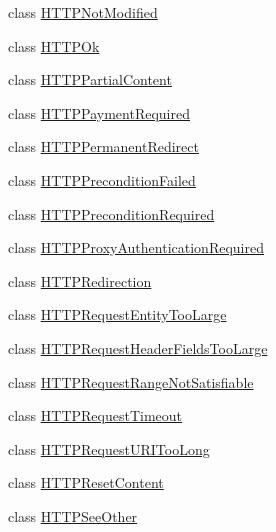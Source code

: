 \begin{DoxyCompactItemize}
\item 
class \hyperlink{classaiohttp_1_1web__exceptions_1_1_h_t_t_p_not_modified}{H\+T\+T\+P\+Not\+Modified}
\item 
class \hyperlink{classaiohttp_1_1web__exceptions_1_1_h_t_t_p_ok}{H\+T\+T\+P\+Ok}
\item 
class \hyperlink{classaiohttp_1_1web__exceptions_1_1_h_t_t_p_partial_content}{H\+T\+T\+P\+Partial\+Content}
\item 
class \hyperlink{classaiohttp_1_1web__exceptions_1_1_h_t_t_p_payment_required}{H\+T\+T\+P\+Payment\+Required}
\item 
class \hyperlink{classaiohttp_1_1web__exceptions_1_1_h_t_t_p_permanent_redirect}{H\+T\+T\+P\+Permanent\+Redirect}
\item 
class \hyperlink{classaiohttp_1_1web__exceptions_1_1_h_t_t_p_precondition_failed}{H\+T\+T\+P\+Precondition\+Failed}
\item 
class \hyperlink{classaiohttp_1_1web__exceptions_1_1_h_t_t_p_precondition_required}{H\+T\+T\+P\+Precondition\+Required}
\item 
class \hyperlink{classaiohttp_1_1web__exceptions_1_1_h_t_t_p_proxy_authentication_required}{H\+T\+T\+P\+Proxy\+Authentication\+Required}
\item 
class \hyperlink{classaiohttp_1_1web__exceptions_1_1_h_t_t_p_redirection}{H\+T\+T\+P\+Redirection}
\item 
class \hyperlink{classaiohttp_1_1web__exceptions_1_1_h_t_t_p_request_entity_too_large}{H\+T\+T\+P\+Request\+Entity\+Too\+Large}
\item 
class \hyperlink{classaiohttp_1_1web__exceptions_1_1_h_t_t_p_request_header_fields_too_large}{H\+T\+T\+P\+Request\+Header\+Fields\+Too\+Large}
\item 
class \hyperlink{classaiohttp_1_1web__exceptions_1_1_h_t_t_p_request_range_not_satisfiable}{H\+T\+T\+P\+Request\+Range\+Not\+Satisfiable}
\item 
class \hyperlink{classaiohttp_1_1web__exceptions_1_1_h_t_t_p_request_timeout}{H\+T\+T\+P\+Request\+Timeout}
\item 
class \hyperlink{classaiohttp_1_1web__exceptions_1_1_h_t_t_p_request_u_r_i_too_long}{H\+T\+T\+P\+Request\+U\+R\+I\+Too\+Long}
\item 
class \hyperlink{classaiohttp_1_1web__exceptions_1_1_h_t_t_p_reset_content}{H\+T\+T\+P\+Reset\+Content}
\item 
class \hyperlink{classaiohttp_1_1web__exceptions_1_1_h_t_t_p_see_other}{H\+T\+T\+P\+See\+Other}
\item 

\end{DoxyCompactItemize}
